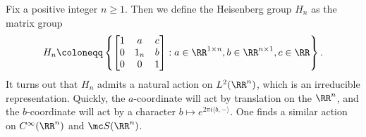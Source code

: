 \documentclass[../notes.tex]{subfiles}
\begin{document}
\begin{example}
	Fix a positive integer $n\ge1$. Then we define the Heisenberg group $H_n$ as the matrix group
	\[H_n\coloneqq\left\{\begin{bmatrix}
		1 & a & c \\
		0 & 1_n & b \\
		0 & 0 & 1
	\end{bmatrix}:a\in\RR^{1\times n},b\in\RR^{n\times1},c\in\RR\right\}.\]
	It turns out that $H_n$ admits a natural action on $L^2(\RR^n)$, which is an irreducible representation. Quickly, the $a$-coordinate will act by translation on the $\RR^n$, and the $b$-coordinate will act by a character $b\mapsto e^{2\pi i\langle b,-\rangle}$. One finds a similar action on $C^\infty(\RR^n)$ and $\mc S(\RR^n)$.
\end{example}
\end{document}
